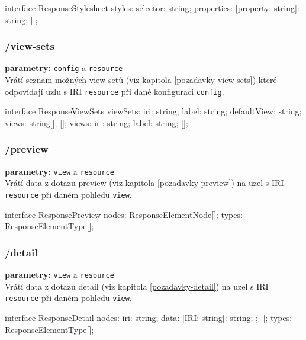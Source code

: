 \begin{code}
interface ResponseStylesheet {
    styles: {
        selector: string;
        properties: {
            [property: string]: string;
        }
    }[];
}
\end{code}

\subsubsection{/view-sets}
\textbf{parametry:} \texttt{config} a \texttt{resource} \\
Vrátí seznam možných view setů (viz kapitola \ref{pozadavky-view-sets}) které odpovídají uzlu s IRI \texttt{resource} při dané konfiguraci \texttt{config}.

\begin{code}
interface ResponseViewSets {
    viewSets: {
        iri: string;
        label: string;
        defaultView: string;
        views: string[];
    }[];
    views: {
        iri: string;
        label: string;
    }[];
}
\end{code}

\subsubsection{/preview}
\textbf{parametry:} \texttt{view} a \texttt{resource} \\
Vrátí data z dotazu preview (viz kapitola \ref{pozadavky-preview}) na uzel s IRI \texttt{resource} při daném pohledu \texttt{view}.

\begin{code}
interface ResponsePreview {
    nodes: ResponseElementNode[];
    types: ResponseElementType[];
}
\end{code}

\subsubsection{/detail}
\textbf{parametry:} \texttt{view} a \texttt{resource} \\
Vrátí data z dotazu detail (viz kapitola \ref{pozadavky-detail}) na uzel s IRI \texttt{resource} při daném pohledu \texttt{view}.

\begin{code}
interface ResponseDetail {
    nodes: {
        iri: string;
        data: {
            [IRI: string]: string;
        };
    }[];
    types: ResponseElementType[];
}
\end{code}

